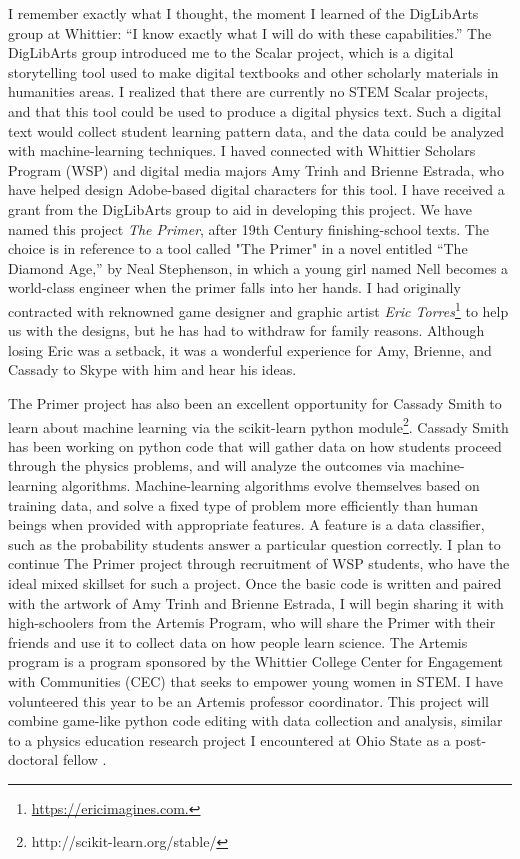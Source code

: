\documentclass[../../main.tex]{subfiles}
\begin{document}
I remember exactly what I thought, the moment I learned of the DigLibArts group at Whittier: ``I know exactly what I will do with these capabilities.''  The DigLibArts group introduced me to the Scalar project, which is a digital storytelling tool used to make digital textbooks and other scholarly materials in humanities areas.  I realized that there are currently no STEM Scalar projects, and that this tool could be used to produce a digital physics text.  Such a digital text would collect student learning pattern data, and the data could be analyzed with machine-learning techniques.  I haved connected with Whittier Scholars Program (WSP) and digital media majors Amy Trinh and Brienne Estrada, who have helped design Adobe-based digital characters for this tool.  I have received a grant from the DigLibArts group to aid in developing this project.  We have named this project \textit{The Primer}, after 19th Century finishing-school texts.  The choice is in reference to a tool called "The Primer" in a novel entitled ``The Diamond Age,'' by Neal Stephenson, in which a young girl named Nell becomes a world-class engineer when the primer falls into her hands.  I had originally contracted with reknowned game designer and graphic artist \textit{Eric Torres}\footnote{\url{https://ericimagines.com.}} to help us with the designs, but he has had to withdraw for family reasons.  Although losing Eric was a setback, it was a wonderful experience for Amy, Brienne, and Cassady to Skype with him and hear his ideas. \\ \hspace{0.1cm}

The Primer project has also been an excellent opportunity for Cassady Smith to learn about machine learning via the scikit-learn python module\footnote{http://scikit-learn.org/stable/}.  Cassady Smith has been working on python code that will gather data on how students proceed through the physics problems, and will analyze the outcomes via machine-learning algorithms.  Machine-learning algorithms evolve themselves based on training data, and solve a fixed type of problem more efficiently than human beings when provided with appropriate features.  A feature is a data classifier, such as the probability students answer a particular question correctly.  I plan to continue The Primer project through recruitment of WSP students, who have the ideal mixed skillset for such a project.  Once the basic code is written and paired with the artwork of Amy Trinh and Brienne Estrada, I will begin sharing it with high-schoolers from the Artemis Program, who will share the Primer with their friends and use it to collect data on how people learn science.  The Artemis program is a program sponsored by the Whittier College Center for Engagement with Communities (CEC) that seeks to empower young women in STEM.  I have volunteered this year to be an Artemis professor coordinator.  This project will combine game-like python code editing with data collection and analysis, similar to a physics education research project I encountered at Ohio State as a post-doctoral fellow \cite{orban2017a}.
\end{document}
